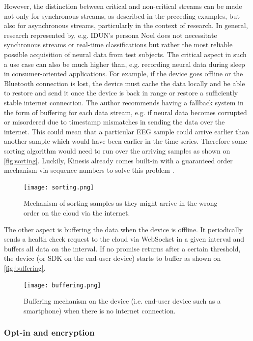 However, the distinction between critical and non-critical streams can be made not only for synchronous streams, as described in the preceding examples, but also for asynchronous streams, particularly in the context of research. In general, research represented by, e.g. IDUN's persona Noel does not necessitate synchronous streams or real-time classifications but rather the most reliable possible acquisition of neural data from test subjects. The critical aspect in such a use case can also be much higher than, e.g. recording neural data during sleep in consumer-oriented applications. For example, if the device goes offline or the Bluetooth connection is lost, the device must cache the data locally and be able to restore and send it once the device is back in range or restore a sufficiently stable internet connection. The author recommends having a fallback system in the form of buffering for each data stream, e.g. if neural data becomes corrupted or misordered due to timestamp mismatches in sending the data over the internet. This could mean that a particular EEG sample could arrive earlier than another sample which would have been earlier in the time series. Therefore some sorting algorithm would need to run over the arriving samples as shown on \autoref{fig:sorting}. Luckily, Kinesis already comes built-in with a guaranteed order mechanism via sequence numbers to solve this problem \citep{amazon_web_services_inc_amazon_nodate}.

\begin{figure}[!ht]
  \centering
  \texttt{[image: sorting.png]}
  \caption{Mechanism of sorting samples as they might arrive in the wrong order on the cloud via the internet.}
  \label{fig:sorting}
\end{figure}

The other aspect is buffering the data when the device is offline. It periodically sends a health check request to the cloud via WebSocket in a given interval and buffers all data on the interval. If no promise returns after a certain threshold, the device (or SDK on the end-user device) starts to buffer as shown on \autoref{fig:buffering}.

\begin{figure}[!ht]
  \centering
  \texttt{[image: buffering.png]}
  \caption{Buffering mechanism on the device (i.e. end-user device such as a smartphone) when there is no internet connection.}
  \label{fig:buffering}
\end{figure}

\subsubsection{Opt-in and encryption}
\label{chapter5-opt-in-and-encryption}

